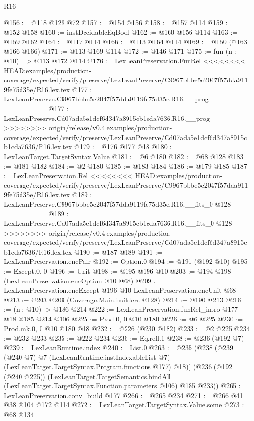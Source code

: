 \begin{lexlean}{R16}
\begin{coremodule}
{{{{{@156 := @118 @128 @72
@157 := @154 @156
@158 := @157 @114
@159 := @152 @158
@160 := instDecidableEqBool
@162 := @160 @156 @114
@163 := @159 @162
@164 := @117 @114
@166 := @113 @164 @114
@169 := @150 (@163 @166 @166)
@171 := @113 @169 @114
@172 := @146 @171
@175 := fun (n : @10) => @113 @172 @114
@176 := LexLeanPreservation.FunRel
<<<<<<<< HEAD:examples/production-coverage/expected/verify/preserve/LexLeanPreserve/C9967bbbe5c2047f57dda9119fe75d35e/R16.lex.tex
@177 := LexLeanPreserve.C9967bbbe5c2047f57dda9119fe75d35e.R16.__prog
========
@177 := LexLeanPreserve.Cd07ada5e1dcf6d347a8915cb1cda7636.R16.__prog
>>>>>>>> origin/release/v0.4:examples/production-coverage/expected/verify/preserve/LexLeanPreserve/Cd07ada5e1dcf6d347a8915cb1cda7636/R16.lex.tex
@179 := @176 @177 @18
@180 := LexLeanTarget.TargetSyntax.Value
@181 := @6 @180
@182 := @68 @128
@183 := @181 @182
@184 := @2 @180
@185 := @183 @184
@186 := @179 @185
@187 := LexLeanPreservation.Rel
<<<<<<<< HEAD:examples/production-coverage/expected/verify/preserve/LexLeanPreserve/C9967bbbe5c2047f57dda9119fe75d35e/R16.lex.tex
@189 := LexLeanPreserve.C9967bbbe5c2047f57dda9119fe75d35e.R16.__fits_0 @128
========
@189 := LexLeanPreserve.Cd07ada5e1dcf6d347a8915cb1cda7636.R16.__fits_0 @128
>>>>>>>> origin/release/v0.4:examples/production-coverage/expected/verify/preserve/LexLeanPreserve/Cd07ada5e1dcf6d347a8915cb1cda7636/R16.lex.tex
@190 := @187 @189
@191 := LexLeanPreservation.encPair
@192 := Option.{0}
@194 := @191 (@192 @10)
@195 := Except.{0, 0}
@196 := Unit
@198 := @195 @196 @10
@203 := @194 @198 (LexLeanPreservation.encOption @10 @68)
@209 := LexLeanPreservation.encExcept @196 @10 LexLeanPreservation.encUnit @68
@213 := @203 @209 (Coverage.Main.builders @128)
@214 := @190 @213
@216 := (n : @10) -> @186 @214
@222 := LexLeanPreservation.funRel_intro @177 @18 @185 @214 @106
@225 := Prod.{0, 0} @10 @180
@226 := @6 @225
@230 := Prod.mk.{0, 0} @10 @180 @18
@232 := @226 (@230 @182)
@233 := @2 @225
@234 := @232 @233
@235 := @222 @234
@236 := Eq.refl.{1}
@238 := @236 (@192 @7)
@239 := LexLeanRuntime.index
@240 := List.{0}
@263 := @235
    (@238
      (@239
        (@240 @7)
        @7
        (LexLeanRuntime.instIndexableList @7)
        (LexLeanTarget.TargetSyntax.Program.functions @177)
        @18))
    (@236
      (@192 (@240 @225))
      (LexLeanTarget.TargetSemantics.bindAll
        (LexLeanTarget.TargetSyntax.Function.parameters @106)
        @185
        @233))
@265 := LexLeanPreservation.conv_build @177
@266 := @265 @234
@271 := @266 @41 @38 @104 @172 @114
@272 := LexLeanTarget.TargetSyntax.Value.some
@273 := @68 @134
}}}}}
\end{coremodule}
\end{lexlean}
